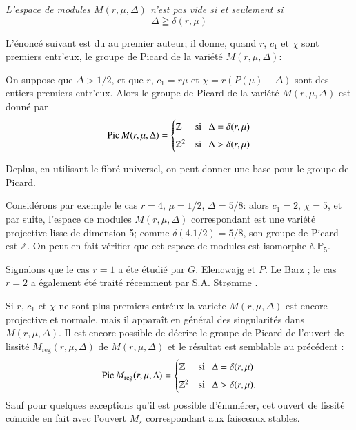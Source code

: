 {\em L'espace de modules $M(r,\mu,\Delta)$ n'est pas vide si et
seulement si}
$$
\Delta\geqq \delta(r,\mu)
$$

L'\'enonc\'e suivant est du au premier auteur; il donne, quand $r$,
$c_{1}$ et $\chi$ sont premiers entr'eux, le groupe de Picard de la
vari\'et\'e $M(r,\mu,\Delta):$ 

\begin{theorem}\label{chap5-thm5}
\cite{chap5-key3} On suppose que $\Delta>1/2$, et que $r$,
$c_{1}=r\mu$ et $\chi=r(P(\mu)-\Delta)$ sont des entiers premiers
entr'eux. Alors le groupe de Picard de la vari\'et\'e
$M(r,\mu,\Delta)$ est donn\'e par
$$
\operatorname{Pic} M(r,\mu,\Delta)=
\begin{cases}
\mathbb{Z} & \text{si~~ } \Delta=\delta(r,\mu)\\[4pt]
\mathbb{Z}^{2} & \text{si~~ }\Delta>\delta(r,\mu)
\end{cases}
$$
\end{theorem}

De\pageoriginale plus, en utilisant le fibr\'e universel, on peut
donner une base pour le groupe de Picard.

Consid\'erons par exemple le cas $r=4$, $\mu=1/2$, $\Delta=5/8$: alors
$c_{1}=2$, $\chi=5$, et par suite, l'espace de modules
$M(r,\mu,\Delta)$ correspondant est une vari\'et\'e projective lisse
de dimension 5; comme $\delta(4.1/2)=5/8$, son groupe de Picard est
$\mathbb{Z}$. On peut en fait v\'erifier que cet espace de modules est
isomorphe \`a $\mathbb{P}_{5}$. 

Signalons que le cas $r=1$ a \'ete \'etudi\'e par $G$. Elencwajg et
$P$. Le Barz \cite{chap5-key5}; le cas $r=2$ a \'egalement \'et\'e
trait\'e r\'ecemment par S.A. Str\o mme \cite{chap5-key16}.

Si $r$, $c_{1}$ et $\chi$ ne sont plus premiers entr\'eux la variete
$M(r,\mu,\Delta)$ est encore projective et normale, mais il appara\^it
en g\'en\'eral des singularit\'es dans $M(r,\mu,\Delta)$. Il est
encore possible de d\'ecrire le groupe de Picard de l'ouvert de
lissit\'e $M_{\text{reg}}(r,\mu,\Delta)$ de $M(r,\mu,\Delta)$ et le
r\'esultat est semblable au pr\'ec\'edent \cite{chap5-key3}: 
$$
\operatorname{Pic} M_{\operatorname{reg}}(r,\mu,\Delta)=
\begin{cases}
\mathbb{Z} & \text{si~~ } \Delta=\delta(r,\mu)\\[4pt]
\mathbb{Z}^{2} & \text{si~~ }\Delta>\delta(r,\mu).
\end{cases}
$$
Sauf pour quelques exceptions qu'il est possible d'\'enum\'erer, cet
ouvert de lissit\'e co\"incide en fait avec l'ouvert $M_{s}$
correspondant aux faisceaux stables. 

